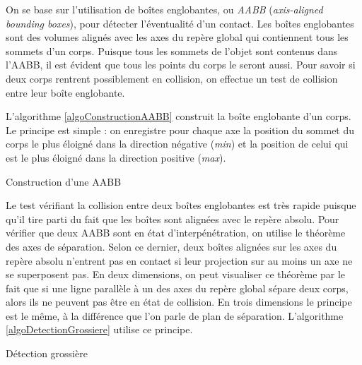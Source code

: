 On se base sur l'utilisation de boîtes englobantes, ou \textit{AABB}
(\textit{axis-aligned bounding boxes}), pour détecter l'éventualité
d'un contact. Les boîtes englobantes sont des volumes alignés avec les
axes du repère global qui contiennent tous les sommets d'un
corps. Puisque tous les sommets de l'objet sont contenus dans l'AABB,
il est évident que tous les points du corps le seront aussi. Pour
savoir si deux corps rentrent possiblement en collision, on effectue
un test de collision entre leur boîte englobante.

L'algorithme \ref{algoConstructionAABB} construit la boîte englobante
d'un corps. Le principe est simple : on enregistre pour chaque axe la
position du sommet du corps le plus éloigné dans la direction négative
(\textit{min}) et la position de celui qui est le plus éloigné dans la
direction positive (\textit{max}).

\begin{algorithm}[h]
  \caption{Construction d'une AABB}
  \label{algoConstructionAABB}
  \dontprintsemicolon
  \BlankLine
  \BlankLine
  \BlankLine
\end{algorithm}

Le test vérifiant la collision entre deux boîtes englobantes est très
rapide puisque qu'il tire parti du fait que les boîtes sont alignées
avec le repère absolu. Pour vérifier que deux AABB sont en état
d'interpénétration, on utilise le théorème des axes de séparation.
Selon ce dernier, deux boîtes alignées sur les axes du repère absolu
n'entrent pas en contact si leur projection sur au moins un axe ne se
superposent pas. En deux dimensions, on peut visualiser ce théorème
par le fait que si une ligne parallèle à un des axes du repère global
sépare deux corps, alors ils ne peuvent pas être en état de
collision. En trois dimensions le principe est le même, à la
différence que l'on parle de plan de séparation. L'algorithme
\ref{algoDetectionGrossiere} utilise ce principe.

\begin{algorithm}[h]
  \caption{Détection grossière}
  \label{algoDetectionGrossiere}
  \dontprintsemicolon
  \BlankLine
  \BlankLine
\end{algorithm}

